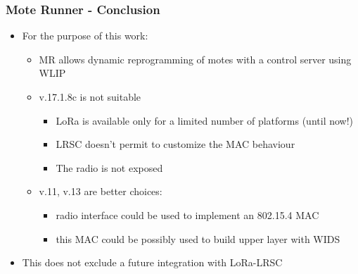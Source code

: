 %

\begin{frame}[fragile]
  \frametitle{Mote Runner - Conclusion}
  \vspace{-1em}
  \begin{itemize}
    \item For the purpose of this work:
    \begin{itemize}
    	\item MR allows dynamic reprogramming of motes with a control server using WLIP
    	\item v.17.1.8c is not suitable
    	\begin{itemize}
	  \item LoRa is available only for a limited number of platforms (until now!)
	  \item LRSC doesn’t permit to customize the MAC behaviour
	  \item The radio is not exposed
    	\end{itemize}
    	\item v.11, v.13 are better choices:
    	\begin{itemize}
	  \item radio interface could be used to implement an 802.15.4 MAC 
	  \item this MAC could be possibly used to build upper layer with WIDS
    	\end{itemize}
    \end{itemize}
    \item This does not exclude a future integration with LoRa-LRSC
  \end{itemize}
\end{frame}